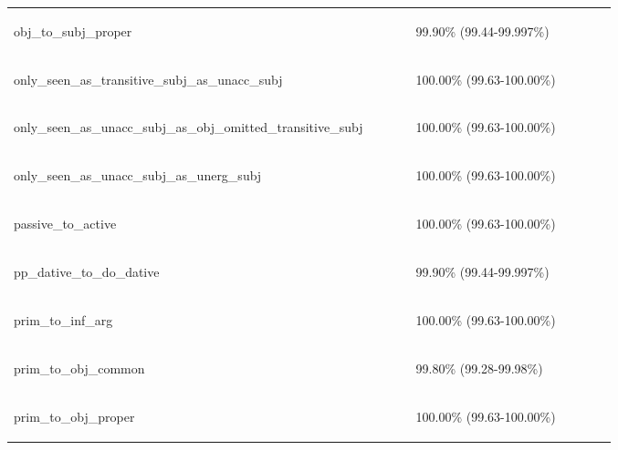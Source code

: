 \documentclass[11pt]{article}
\begin{document}
\begin{table}
\begin{tabular}{p{0.6\linewidth} p{0.3\linewidth}}
\begin{tiny}obj\_to\_subj\_proper\end{tiny} & \begin{tiny} 99.90\% (99.44-99.997\%)\end{tiny} \\
\begin{tiny}only\_seen\_as\_transitive\_subj\_as\_unacc\_subj\end{tiny} & \begin{tiny} 100.00\% (99.63-100.00\%)\end{tiny} \\
\begin{tiny}only\_seen\_as\_unacc\_subj\_as\_obj\_omitted\_transitive\_subj\end{tiny} & \begin{tiny} 100.00\% (99.63-100.00\%)\end{tiny} \\
\begin{tiny}only\_seen\_as\_unacc\_subj\_as\_unerg\_subj\end{tiny} & \begin{tiny} 100.00\% (99.63-100.00\%)\end{tiny} \\
\begin{tiny}passive\_to\_active\end{tiny} & \begin{tiny} 100.00\% (99.63-100.00\%)\end{tiny} \\
\begin{tiny}pp\_dative\_to\_do\_dative\end{tiny} & \begin{tiny} 99.90\% (99.44-99.997\%)\end{tiny} \\
\begin{tiny}prim\_to\_inf\_arg\end{tiny} & \begin{tiny} 100.00\% (99.63-100.00\%)\end{tiny} \\
\begin{tiny}prim\_to\_obj\_common\end{tiny} & \begin{tiny} 99.80\% (99.28-99.98\%)\end{tiny} \\
\begin{tiny}prim\_to\_obj\_proper\end{tiny} & \begin{tiny} 100.00\% (99.63-100.00\%)\end{tiny} \\

\end{tabular}
\end{table}
\end{document}
